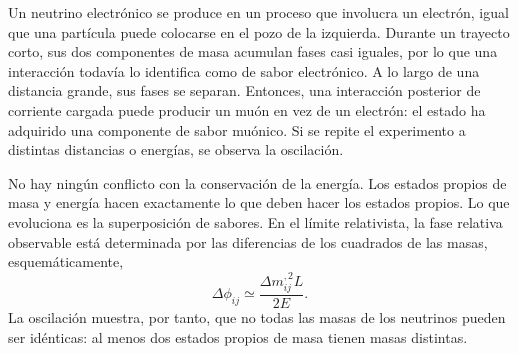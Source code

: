 Un neutrino electrónico se produce en un proceso que involucra un electrón, igual que una partícula puede colocarse en el pozo de la izquierda. Durante un trayecto corto, sus dos componentes de masa acumulan fases casi iguales, por lo que una interacción todavía lo identifica como de sabor electrónico. A lo largo de una distancia grande, sus fases se separan. Entonces, una interacción posterior de corriente cargada puede producir un muón en vez de un electrón: el estado ha adquirido una componente de sabor muónico. Si se repite el experimento a distintas distancias o energías, se observa la oscilación.

No hay ningún conflicto con la conservación de la energía. Los estados propios de masa y energía hacen exactamente lo que deben hacer los estados propios. Lo que evoluciona es la superposición de sabores. En el límite relativista, la fase relativa observable está determinada por las diferencias de los cuadrados de las masas, esquemáticamente,
\begin{equation}
\Delta\phi_{ij}\simeq \frac{\Delta m_{ij}^{,2}L}{2E}.
\end{equation}
La oscilación muestra, por tanto, que no todas las masas de los neutrinos pueden ser idénticas: al menos dos estados propios de masa tienen masas distintas.

\begin{classroomqa}
\end{classroomqa}

\begin{classroomqa}
\end{classroomqa}

\begin{classroomqa}
\end{classroomqa}

